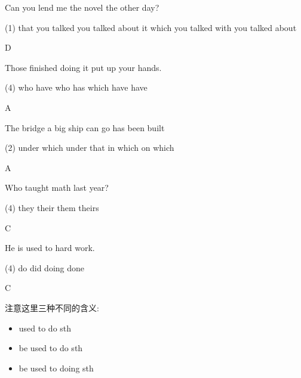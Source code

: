 \begin{question}[tags={xiaoxuect}]
Can you lend me the novel \blank[width=1cm]{} the other day?

\begin{tasks}(1)
    \task that you talked
    \task you talked about it
    \task which you talked with
    \task you talked about
  \end{tasks}
\end{question}
\begin{solution}
D
\end{solution}

\begin{question}[tags={xiaoxuect}]
Those \blank[width=1cm]{} finished doing it put up your hands.
 \begin{tasks}(4)
    \task who have
    \task who has
    \task which have
    \task have
  \end{tasks}
\end{question}
\begin{solution}
A
\end{solution}

\begin{question}[tags={xiaoxuect}]
The bridge \blank[width=1cm]{} a big ship can go has been built

\begin{tasks}(2)
    \task under which
    \task under that
    \task in which
    \task on which
  \end{tasks}
\end{question}
\begin{solution}
A
\end{solution}

\begin{question}[tags={xiaoxuect}]
Who taught \blank[width=1cm]{} math last year?

\begin{tasks}(4)
    \task they
    \task their
    \task them
    \task theirs
  \end{tasks}
\end{question}
\begin{solution}
C
\end{solution}

\begin{question}[tags={xiaoxuect}]
He is used to \blank[width=1cm]{} hard work.

\begin{tasks}(4)
    \task do
    \task did
    \task doing
    \task done
  \end{tasks}
\end{question}
\begin{solution}
C

注意这里三种不同的含义:

\begin{itemize}
    \item used to do sth
    \item be used to do sth
    \item be used to doing sth
\end{itemize}
\end{solution}


